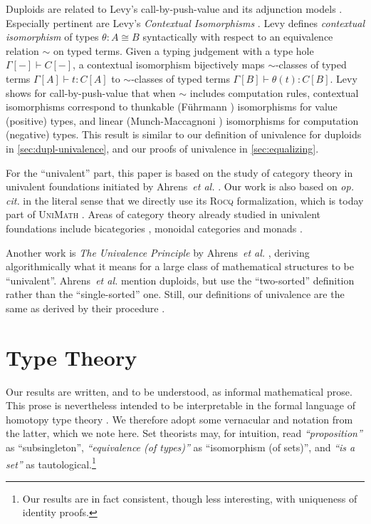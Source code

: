 \documentclass[runningheads]{llncs}
\makeatletter
\newcommand*{\opcit}{\textit{op.\@{} cit.\@}}
\newcommand*{\etal}{~\textit{et al.\@}}
\makeatother
\begin{document}
Duploids are related to Levy's call\hyp{}by\hyp{}push\hyp{}value and its adjunction
models \cite{Levy99,Levy03b}. Especially pertinent are Levy's
\emph{Contextual Isomorphisms} \cite{Levy17}. Levy defines \emph{contextual
isomorphism} of types \(\theta : A \cong B\) syntactically with
respect to an equivalence relation \(\sim\) on typed terms. Given a
typing judgement with a type hole \(\Gamma[-] \vdash C[-]\), a
contextual isomorphism bijectively maps \(\sim\)-classes of typed
terms \(\Gamma[A] \vdash t : C[A]\) to \(\sim\)-classes of typed terms
\(\Gamma[B] \vdash \theta(t) : C[B]\). Levy shows for
call\hyp{}by\hyp{}push\hyp{}value that when \(\sim\) includes computation rules,
contextual isomorphisms correspond to thunkable (Führmann
\cite{Fuhrmann99}) isomorphisms for value (positive) types, and
linear (Munch\hyp{}Maccagnoni \cite{MunchMaccagnoni14}) isomorphisms for
computation (negative) types. This result is similar to our definition of
univalence for duploids in \autoref{sec:dupl-univalence}, and our
proofs of univalence in \autoref{sec:equalizing}.

For the ``univalent'' part, this paper is based on the study of category
theory in univalent foundations initiated by Ahrens\etal{}
\cite{Ahrens15}. Our work is also based on \opcit{} in the
literal sense that we directly use its \textsc{Rocq} formalization, which
is today part of \textsc{UniMath} \cite{UniMath}. Areas of category
theory already studied in univalent foundations include bicategories
\cite{Ahrens21}, monoidal categories \cite{Wullaert23} and monads
\cite{vanDerWeide25}.

Another work is \emph{The Univalence Principle} by Ahrens\etal{}
\cite{Ahrens22}, deriving algorithmically what it means for a large
class of mathematical structures to be ``univalent''.  Ahrens\etal{}
mention duploids, but use the ``two\hyp{}sorted'' definition rather than the
``single\hyp{}sorted'' one. Still, our definitions of univalence are the same
as derived by their procedure \cite[Example 13.5]{Ahrens22}.
\section{Type Theory}
\label{sec:type-theory}
Our results are written, and to be understood, as informal
mathematical prose. This prose is nevertheless intended to be
interpretable in the formal language of homotopy type theory
\cite{hottbook,Rijke25}. We therefore adopt some vernacular and
notation from the latter, which we note here. Set theorists may, for
intuition, read \emph{``proposition''} as ``subsingleton'', \emph{``equivalence (of
types)''} as ``isomorphism (of sets)'', and \emph{``is a set''} as
tautological.\footnote{Our results are in fact consistent, though less interesting, with uniqueness of identity proofs.\label{org13f6ecc}}
\end{document}
